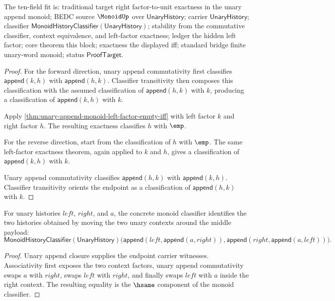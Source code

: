 The ten-field fit is: traditional target right factor-to-unit exactness in the
unary append monoid; BEDC source $\MonoidUp$ over $\mathsf{UnaryHistory}$;
carrier $\mathsf{UnaryHistory}$; classifier
$\mathsf{MonoidHistoryClassifier}(\mathsf{UnaryHistory})$; stability from the
commutative classifier, context equivalence, and left-factor exactness; ledger
the hidden left factor; core theorem this block; exactness the displayed iff;
standard bridge finite unary-word monoid; status $\mathsf{ProofTarget}$.

\begin{proof}
For the forward direction, unary append commutativity first classifies
$\mathsf{append}(k,h)$ with $\mathsf{append}(h,k)$. Classifier transitivity
then composes this classification with the assumed classification of
$\mathsf{append}(h,k)$ with $k$, producing a classification of
$\mathsf{append}(k,h)$ with $k$.

Apply \autoref{thm:unary-append-monoid-left-factor-empty-iff} with left factor
$k$ and right factor $h$. The resulting exactness classifies $h$ with $\emp$.

For the reverse direction, start from the classification of $h$ with $\emp$.
The same left-factor exactness theorem, again applied to $k$ and $h$, gives a
classification of $\mathsf{append}(k,h)$ with $k$.

Unary append commutativity classifies $\mathsf{append}(h,k)$ with
$\mathsf{append}(k,h)$. Classifier transitivity orients the endpoint as a
classification of $\mathsf{append}(h,k)$ with $k$.
\end{proof}

\begin{theorem}
\label{thm:unary-append-monoid-classifier-context-swap}
For unary histories $left$, $right$, and $a$, the concrete monoid
classifier identifies the two histories obtained by moving the two unary
contexts around the middle payload:
$$
\mathsf{MonoidHistoryClassifier}(\mathsf{UnaryHistory})
\bigl(\mathsf{append}(left,\mathsf{append}(a,right)),
\mathsf{append}(right,\mathsf{append}(a,left))\bigr).
$$
\end{theorem}
\begin{proof}
Unary append closure supplies the endpoint carrier witnesses. Associativity
first exposes the two context factors, unary append commutativity swaps
$a$ with $right$, swaps $left$ with $right$, and finally swaps
$left$ with $a$ inside the right context. The resulting equality is the
$\hsame$ component of the monoid classifier.
\end{proof}

